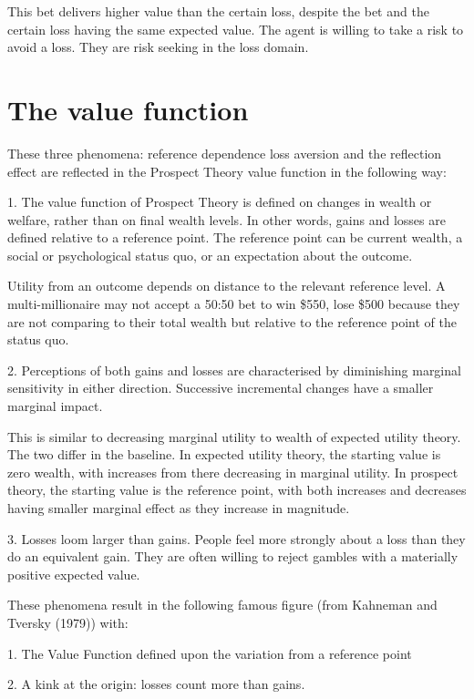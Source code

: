 \documentclass[
  letterpaper,
  DIV=11,
  numbers=noendperiod]{scrreprt}
\begin{document}
This bet delivers higher value than the certain loss, despite the bet
and the certain loss having the same expected value. The agent is
willing to take a risk to avoid a loss. They are risk seeking in the
loss domain.

\hypertarget{the-value-function}{%
\chapter{The value function}\label{the-value-function}}

These three phenomena: reference dependence loss aversion and the
reflection effect are reflected in the Prospect Theory value function in
the following way:

1. The value function of Prospect Theory is defined on changes in wealth
or welfare, rather than on final wealth levels. In other words, gains
and losses are defined relative to a reference point. The reference
point can be current wealth, a social or psychological status quo, or an
expectation about the outcome.

Utility from an outcome depends on distance to the relevant reference
level. A multi-millionaire may not accept a 50:50 bet to win \$550, lose
\$500 because they are not comparing to their total wealth but relative
to the reference point of the status quo.

2. Perceptions of both gains and losses are characterised by diminishing
marginal sensitivity in either direction. Successive incremental changes
have a smaller marginal impact.

This is similar to decreasing marginal utility to wealth of expected
utility theory. The two differ in the baseline. In expected utility
theory, the starting value is zero wealth, with increases from there
decreasing in marginal utility. In prospect theory, the starting value
is the reference point, with both increases and decreases having smaller
marginal effect as they increase in magnitude.

3. Losses loom larger than gains. People feel more strongly about a loss
than they do an equivalent gain. They are often willing to reject
gambles with a materially positive expected value.

These phenomena result in the following famous figure (from Kahneman and
Tversky (1979)) with:

1. The Value Function defined upon the variation from a reference point

2. A kink at the origin: losses count more than gains.
\end{document}
